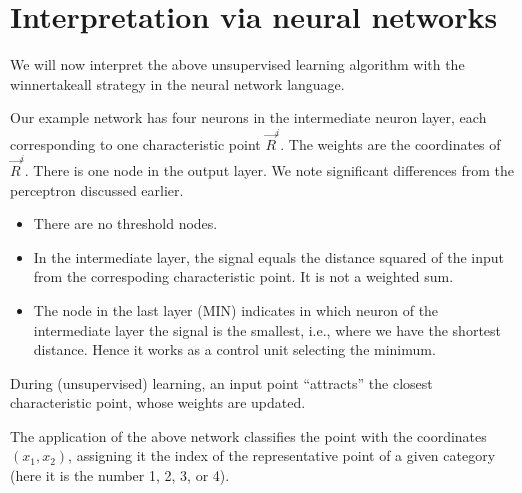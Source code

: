 \documentclass[letterpaper,10pt,english]{jupyterBook}
\begin{document}
\section{Interpretation via neural networks}
\label{\detokenize{docs/unsupervised:interpretation-via-neural-networks}}\label{\detokenize{docs/unsupervised:inn-sec}}
\sphinxAtStartPar
We will now interpret the above unsupervised learning algorithm with the winner\sphinxhyphen{}take\sphinxhyphen{}all strategy in the neural network language.

\noindent{}

\sphinxAtStartPar
Our example network has four neurons in the intermediate neuron layer, each corresponding to one characteristic point \(\vec{R}^i\). The weights are the coordinates of \(\vec{R}^i\). There is one node in the output layer. We note significant differences from the perceptron discussed earlier.
\begin{itemize}
\item {} 
\sphinxAtStartPar
There are no threshold nodes.

\item {} 
\sphinxAtStartPar
In the intermediate layer, the signal equals the distance squared of the input from the correspoding characteristic point. It is not a weighted sum.

\item {} 
\sphinxAtStartPar
The node in the last layer (MIN) indicates in which neuron of the intermediate layer the signal is the smallest, i.e., where we have the shortest distance. Hence it works as a control unit selecting the minimum.

\end{itemize}

\sphinxAtStartPar
During (unsupervised) learning, an input point “attracts” the closest characteristic point, whose weights are updated.

\sphinxAtStartPar
The application of the above network classifies the point with the coordinates \((x_1, x_2)\), assigning it the index of the representative point of a given category (here it is the number 1, 2, 3, or 4).
\end{document}
